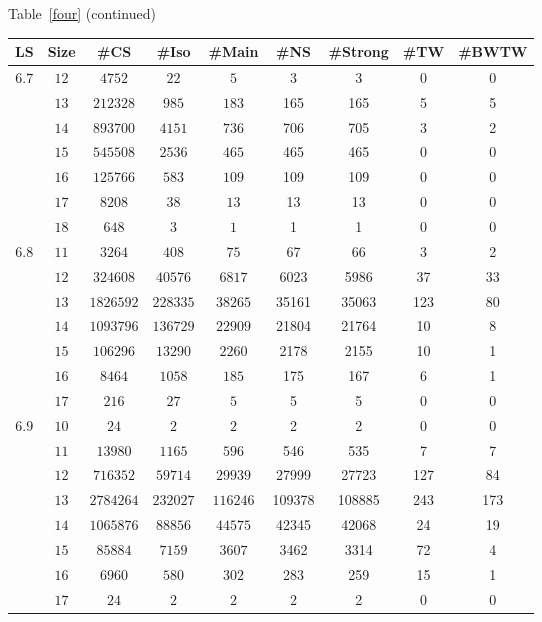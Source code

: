 \documentclass[12pt]{report}
\begin{document}
\newpage
\begin{center}
Table~\ref{four} (continued)
\begin{tabular}{|c|c|c|c|c|c|c|c|c|} \hline
LS & Size & \#CS & \#Iso & \#Main& \#NS & \#Strong & \#TW & \#BWTW \\ \hline
$6.7$ & $12$  & $4752$ & $22$ & $5$ & 3 & 3 & 0 & 0 \\
      & $13$  & $212328$ & $985$ & $183$ & 165 & 165 & 5 & 5 \\
      & $14$  & $893700$ & $4151$ & $736$ & 706 & 705 & 3 & 2 \\
      & $15$  & $545508$ & $2536$ & $465$ & 465 & 465 & 0 & 0 \\
      & $16$  & $125766$ & $583$ & $109$ & 109 & 109 & 0 & 0 \\
      & $17$  & $8208$ & $38$ & $13$ & 13 & 13 & 0 & 0 \\ 
      & $18$  & $648$ & $3$ & $1$ & 1 & 1 & 0 & 0 \\ \hline
$6.8$ & $11$  & $3264$ & $408$ & $75$ & 67 & 66 & 3 & 2 \\
      & $12$  & $324608$ & $40576$ & $6817$ & 6023 & 5986 & 37 & 33 \\
      & $13$  & $1826592$ & $228335$ & $38265$ & 35161 & 35063 & 123 & 80 \\
      & $14$  & $1093796$ & $136729$ & $22909$ & 21804 & 21764 & 10 & 8 \\
      & $15$  & $106296$ & $13290$ & $2260$ & 2178 & 2155 & 10 & 1 \\
      & $16$  & $8464$ & $1058$ & $185$ & 175 & 167 & 6 & 1 \\ 
      & $17$  & $216$ & $27$ & $5$ & 5 & 5 & 0 & 0 \\ \hline
$6.9$ & $10$  & $24$ & $2$ & $2$ & 2 & 2 & 0 & 0 \\
      & $11$  & $13980$ & $1165$ & $596$ & 546 & 535 & 7 & 7 \\
      & $12$  & $716352$ & $59714$ & $29939$ & 27999 & 27723 & 127 & 84 \\
      & $13$  & $2784264$ & $232027$ & $116246$ & 109378 & 108885 & 243 & 173 \\
      & $14$  & $1065876$ & $88856$ & $44575$ & 42345 & 42068 & 24 & 19 \\
      & $15$  & $85884$ & $7159$ & $3607$ & 3462 & 3314 & 72 & 4 \\
      & $16$  & $6960$ & $580$ & $302$ & 283 & 259 & 15 & 1 \\ 
      & $17$  & $24$ & $2$ & $2$ & 2 & 2 & 0 & 0 \\ \hline
\end{tabular}\vspace {3mm} \\
\end{center}
\end{document}

